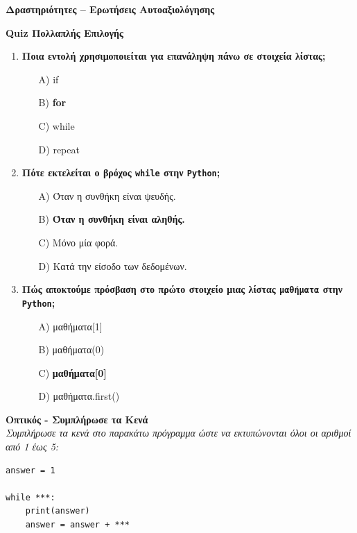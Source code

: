 \documentclass[11pt]{report}
\begin{document}
\vspace{1em}
\textbf{Δραστηριότητες – Ερωτήσεις Αυτοαξιολόγησης}

\textbf{Quiz Πολλαπλής Επιλογής}
\begin{enumerate}
    \item \textbf{Ποια εντολή χρησιμοποιείται για επανάληψη πάνω σε στοιχεία λίστας;}
    \begin{itemize}
        \item[A)] if
        \item[B)] \textbf{for}
        \item[C)] while
        \item[D)] repeat
    \end{itemize}

    \item \textbf{Πότε εκτελείται ο βρόχος \texttt{while} στην \texttt{Python};}
    \begin{itemize}
        \item[A)] Όταν η συνθήκη είναι ψευδής.
        \item[B)] \textbf{Όταν η συνθήκη είναι αληθής.}
        \item[C)] Μόνο μία φορά.
        \item[D)] Κατά την είσοδο των δεδομένων.
    \end{itemize}

    \item \textbf{Πώς αποκτούμε πρόσβαση στο πρώτο στοιχείο μιας λίστας \texttt{μαθήματα} στην \texttt{Python};}
    \begin{itemize}
        \item[A)] μαθήματα[1]
        \item[B)] μαθήματα(0)
        \item[C)] \textbf{μαθήματα[0]}
        \item[D)] μαθήματα.first()
    \end{itemize}
\end{enumerate}

\vspace{1em}
\textbf{Οπτικός - Συμπλήρωσε τα Κενά} \\[0.5em]
\textit{Συμπλήρωσε τα κενά στο παρακάτω πρόγραμμα ώστε να εκτυπώνονται όλοι οι αριθμοί από 1 έως 5:}

\begin{tcolorbox}[colback=gray!5!white, colframe=black!75!black]
\begin{verbatim}
answer = 1

while ***:
    print(answer)
    answer = answer + ***
\end{verbatim}
\end{tcolorbox}
\end{document}
